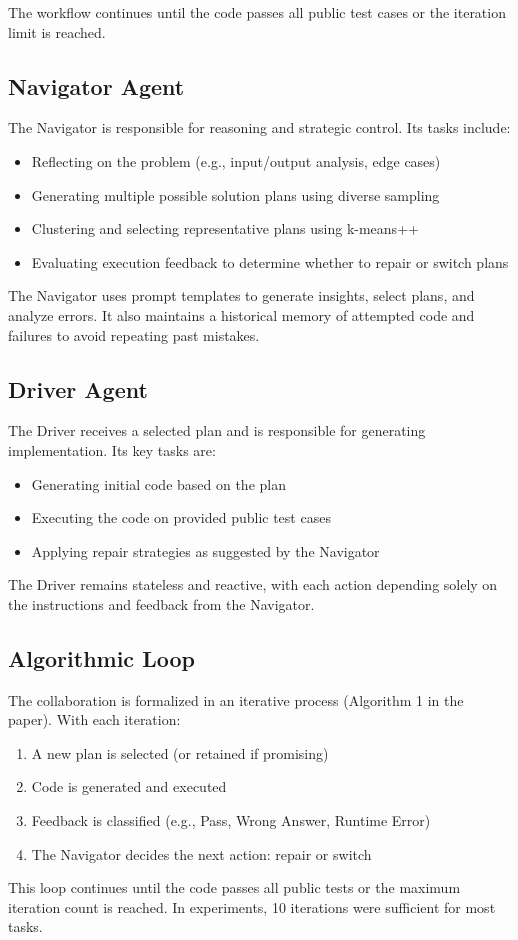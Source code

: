 \documentclass[11pt,a4paper]{article}
\begin{document}
The workflow continues until the code passes all public test cases or the iteration limit is reached.

\subsection{Navigator Agent}
The Navigator is responsible for reasoning and strategic control. Its tasks include:
\begin{itemize}
\item Reflecting on the problem (e.g., input/output analysis, edge cases)
\item Generating multiple possible solution plans using diverse sampling
\item Clustering and selecting representative plans using k-means++
\item Evaluating execution feedback to determine whether to repair or switch plans
\end{itemize}
The Navigator uses prompt templates to generate insights, select plans, and analyze errors. It also maintains a historical memory of attempted code and failures to avoid repeating past mistakes.

\subsection{Driver Agent}
The Driver receives a selected plan and is responsible for generating implementation. Its key tasks are:
\begin{itemize}
\item Generating initial code based on the plan
\item Executing the code on provided public test cases
\item Applying repair strategies as suggested by the Navigator
\end{itemize}
The Driver remains stateless and reactive, with each action depending solely on the instructions and feedback from the Navigator.

\subsection{Algorithmic Loop}
The collaboration is formalized in an iterative process (Algorithm 1 in the paper). With each iteration:
\begin{enumerate}
\item A new plan is selected (or retained if promising)
\item Code is generated and executed
\item Feedback is classified (e.g., Pass, Wrong Answer, Runtime Error)
\item The Navigator decides the next action: repair or switch
\end{enumerate}
This loop continues until the code passes all public tests or the maximum iteration count is reached. In experiments, 10 iterations were sufficient for most tasks.
\end{document}
